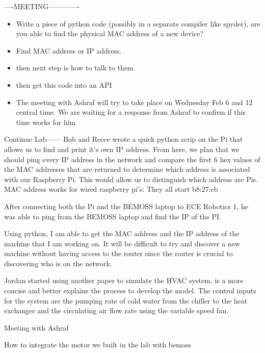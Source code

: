 \documentclass[fontsize=11pt, %
                             paper=letter, %
                             twoside, %
                             captions=tableheading,
                             index=totoc,
                             hyperref]{labbook}
\begin{document}
----MEETING-------------
\begin{itemize}
    \item Write a piece of python code (possibly in a separate compiler like spyder), are you able to find the physical MAC address of a new device?
    \item Find MAC address or IP address. 
    \item then next step is how to talk to them
    \item then get this code into an API 
    \item The meeting with Ashraf will try to take place on Wednesday Feb 6 and 12 central time. We are waiting for a response from Ashraf to confirm if this time works for him
\end{itemize} 

Continue Lab------
Bob and Reece wrote a quick python scrip on the Pi that allows us to find and print it's own IP address. From here, we plan that we should ping every IP address in the network and compare the first 6 hex values of the MAC addresses that are returned to determine which address is associated with our Raspberry Pi. This would allow us to distinguish which address are Pis. MAC address works for wired raspberry pi's: They all start b8:27:eb

After connecting both the Pi and the BEMOSS laptop to ECE Robotics 1, he was able to ping from the BEMOSS laptop and find the IP of the PI. 

Using python, I am able to get the MAC address and the IP address of the machine that I am working on. It will be difficult to try and discover a new machine without having access to the router since the router is crucial to discovering who is on the network.

Jordan started using another paper to simulate the HVAC system. \cite{Serrano1999} is a more concise and better explains the process to develop the model. The control inputs for the system are the  pumping  rate  of  cold  water  from  the  chiller  to  the  heat exchanger and the circulating air flow rate using the variable speed fan. 

Meeting with Ashraf 

How to integrate the motor we built in the lab with bemoss 
\end{document}
